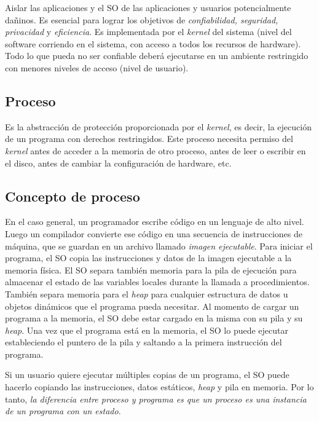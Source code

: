 \documentclass[a4paper,10pt,spanish]{article}
\begin{document}
Aislar las aplicaciones y el SO de las aplicaciones y usuarios potencialmente dañinos. Es esencial para lograr los objetivos de \textit{confiabilidad, seguridad, privacidad} y \textit{eficiencia}. Es implementada por el \textit{kernel} del sistema (nivel del software corriendo en el sistema, con acceso a todos los recursos de hardware). Todo lo que pueda no ser confiable deberá ejecutarse en un ambiente restringido con menores niveles de acceso (nivel de usuario). \\

\subsection{Proceso}

Es la abstracción de protección proporcionada por el \textit{kernel}, es decir, la ejecución de un programa con derechos restringidos. Este proceso necesita permiso del \textit{kernel} antes de acceder a la memoria de otro proceso, antes de leer o escribir en el disco, antes de cambiar la configuración de hardware, etc. \\

\subsection{Concepto de proceso}

En el caso general, un programador escribe código en un lenguaje de alto nivel. Luego un compilador convierte ese código en una secuencia de instrucciones de máquina, que se guardan en un archivo llamado \textit{imagen ejecutable}. Para iniciar el programa, el SO copia las instrucciones y datos de la imagen ejecutable a la memoria física. El SO separa también memoria para la pila de ejecución para almacenar el estado de las variables locales durante la llamada a procedimientos. También separa memoria para el \textit{heap} para cualquier estructura de datos u objetos dinámicos que el programa pueda necesitar. Al momento de cargar un programa a la memoria, el SO debe estar cargado en la misma con su pila y su \textit{heap}. Una vez que el programa está en la memoria, el SO lo puede ejecutar estableciendo el puntero de la pila y saltando a la primera instrucción del programa.

Si un usuario quiere ejecutar múltiples copias de un programa, el SO puede hacerlo copiando las instrucciones, datos estáticos, \textit{heap} y pila en memoria. Por lo tanto, \textit{la diferencia entre proceso y programa es que un proceso es una instancia de un programa con un estado}.
\end{document}
